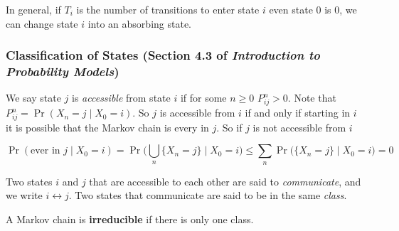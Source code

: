 In general, if \(T_i\) is the number of transitions to enter state \(i\) even state 0 is 0, we can change state \(i\) into an absorbing state.

\subsubsection{Classification of States (Section 4.3 of \textit{Introduction to Probability Models})}

We say state \(j\) is \textit{accessible} from state \(i\) if for some \(n \geq 0\) \(P_{ij}^n > 0\). Note that \(P_{ij}^n=\Pr(X_n = j \mid X_0 = i)\). So \(j\) is accessible from \(i\) if and only if starting in \(i\) it is possible that the Markov chain is every in \(j\). So if \(j\) is not accessible from \(i\)

\[
\Pr(\text{ever in } j \mid X_0 = i) = \Pr \bigg( \bigcup_{n} \{X_n = j \} \mid X_0 = i \bigg) \leq \sum_{n} \Pr \big( \{X_n = j \} \mid X_0 = i \big) = 0
\]

Two states \(i\) and \(j\) that are accessible to each other are said to \textit{communicate}, and we write \(i \leftrightarrow j\). Two states that communicate are said to be in the same \textit{class}.

A Markov chain is \textbf{irreducible} if there is only one class.

